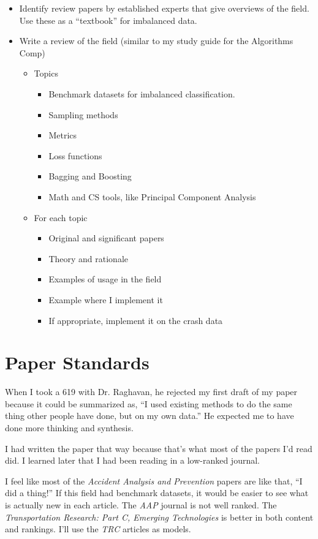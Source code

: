 \begin{itemize}
	\item Identify review papers by established experts that give overviews of the field.  Use these as a ``textbook'' for imbalanced data.
	\item Write a review of the field (similar to my study guide for the Algorithms Comp)
	\begin{itemize}
		\item Topics
		\begin{itemize}
			\item Benchmark datasets for imbalanced classification.
			\item Sampling methods
			\item Metrics
			\item Loss functions
			\item Bagging and Boosting
			\item Math and CS tools, like Principal Component Analysis
		\end{itemize}
		\item For each topic
		\begin{itemize}
			\item Original and significant papers
			\item Theory and rationale
			\item Examples of usage in the field
			\item Example where I implement it
			\item If appropriate, implement it on the crash data
		\end{itemize}

	\end{itemize}
\end{itemize}

\section{Paper Standards}

When I took a 619 with Dr. Raghavan, he rejected my first draft of my paper because it could be summarized as, ``I used existing methods to do the same thing other people have done, but on my own data.''  He expected me to have done more thinking and synthesis.  

I had written the paper that way because that's what most of the papers I'd read did.  I learned later that I had been reading in a low-ranked journal.  

I feel like most of the {\it Accident Analysis and Prevention} papers are like that, ``I did a thing!''  If this field had benchmark datasets, it would be easier to see what is actually new in each article.  The {\it AAP} journal is not well ranked.  The {\it Transportation Research: Part C, Emerging Technologies} is better in both content and rankings.  I'll use the {\it TRC} articles as models.

